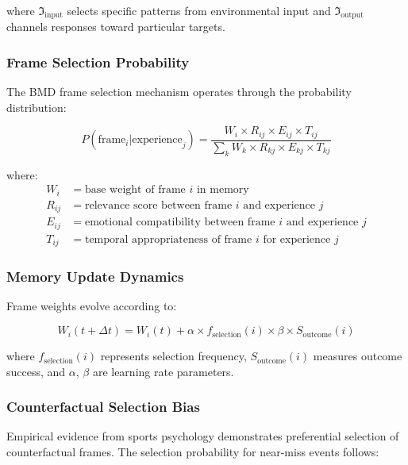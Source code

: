 \documentclass[12pt,a4paper]{article}
\begin{document}
where $\Im_{\text{input}}$ selects specific patterns from environmental input and $\Im_{\text{output}}$ channels responses toward particular targets.

\subsubsection{Frame Selection Probability}

The BMD frame selection mechanism operates through the probability distribution:

\begin{equation}
P(\text{frame}_i | \text{experience}_j) = \frac{W_i \times R_{ij} \times E_{ij} \times T_{ij}}{\sum_k W_k \times R_{kj} \times E_{kj} \times T_{kj}}
\end{equation}

where:
\begin{align}
W_i &= \text{base weight of frame } i \text{ in memory} \\
R_{ij} &= \text{relevance score between frame } i \text{ and experience } j \\
E_{ij} &= \text{emotional compatibility between frame } i \text{ and experience } j \\
T_{ij} &= \text{temporal appropriateness of frame } i \text{ for experience } j
\end{align}

\subsubsection{Memory Update Dynamics}

Frame weights evolve according to:

\begin{equation}
W_i(t+\Delta t) = W_i(t) + \alpha \times f_{\text{selection}}(i) \times \beta \times S_{\text{outcome}}(i)
\end{equation}

where $f_{\text{selection}}(i)$ represents selection frequency, $S_{\text{outcome}}(i)$ measures outcome success, and $\alpha$, $\beta$ are learning rate parameters.

\subsubsection{Counterfactual Selection Bias}

Empirical evidence from sports psychology demonstrates preferential selection of counterfactual frames. The selection probability for near-miss events follows:
\end{document}
